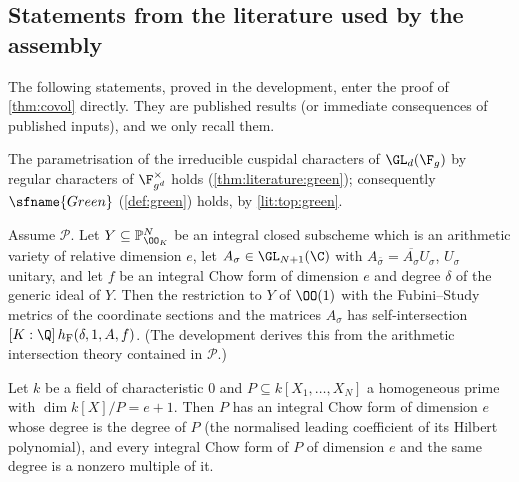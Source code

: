 \subsection{Statements from the literature used by the assembly}\label{sec:pf:covol:literature}

The following statements, proved in the development, enter the proof of \cref{thm:covol} directly. They
are published results (or immediate consequences of published inputs), and we only recall them.

\begin{littheorem}\label{pf:covol:lit:green}
The parametrisation of the irreducible cuspidal characters of $\GL_d(\F_g)$ by regular characters of
$\F_{g^d}^\times$ holds (\cref{thm:literature:green}); consequently $\sfname{Green}$
(\cref{def:green}) holds, by \cref{lit:top:green}.
\end{littheorem}

\begin{littheorem}\label{pf:covol:lit:fs}
Assume $\mathcal P$. Let $Y\subseteq\mathbb P^N_{\OO_K}$ be an integral closed subscheme which is an
arithmetic variety of relative dimension $e$, let $A_\sigma\in\GL_{N+1}(\C)$ with
$A_{\bar\sigma}=\overline{A_\sigma}U_\sigma$, $U_\sigma$ unitary, and let $f$ be an integral Chow form of
dimension $e$ and degree $\delta$ of the generic ideal of $Y$. Then the restriction to $Y$ of $\OO(1)$
with the Fubini--Study metrics of the coordinate sections and the matrices $A_\sigma$ has
self-intersection $[K:\Q]\,\covolHform(\delta,1,A,f)$. (The development derives this from the arithmetic
intersection theory contained in $\mathcal P$.)
\end{littheorem}

\begin{littheorem}\label{pf:covol:lit:chowint}
Let $k$ be a field of characteristic $0$ and $P\subseteq k[X_1,\dots,X_N]$ a homogeneous prime with
$\dim k[X]/P=e+1$. Then $P$ has an integral Chow form of dimension $e$ whose degree is the degree of $P$
(the normalised leading coefficient of its Hilbert polynomial), and every integral Chow form of $P$ of
dimension $e$ and the same degree is a nonzero multiple of it.
\end{littheorem}

